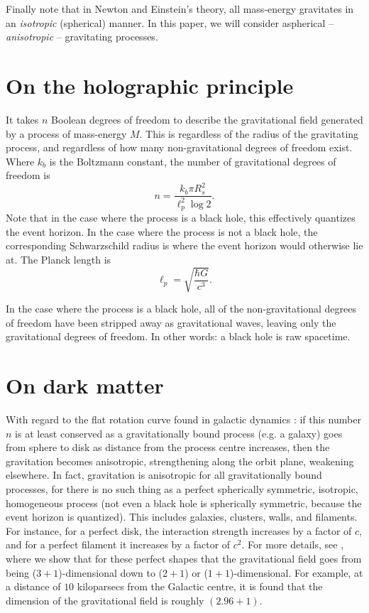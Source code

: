 \documentclass[12pt]{article}
\begin{document}
Finally note that in Newton and Einstein's theory, all mass-energy gravitates in an {\textit{isotropic}} (spherical) manner.
In this paper, we will consider aspherical -- {\textit{anisotropic}} -- gravitating processes.






\section{On the holographic principle}

It takes $n$ Boolean degrees of freedom to describe the gravitational field \cite{hooft, susskind} generated by a process of mass-energy $M$.
This is regardless of the radius of the gravitating process, and regardless of how many non-gravitational degrees of freedom exist.
Where $k_b$ is the Boltzmann constant, the number of gravitational degrees of freedom is
\begin{equation}
n = \frac{k_b \pi R_s^2}{ \ell_p^2 \log 2}.
\end{equation}
Note that in the case where the process is a black hole, this effectively quantizes the event horizon.
In the case where the process is not a black hole, the corresponding Schwarzschild radius is where the event horizon would otherwise lie at.
The Planck length is
\begin{equation}
\ell_p = \sqrt{\frac{\hbar G}{c^3}}.
\end{equation}

In the case where the process is a black hole, all of the non-gravitational degrees of freedom have been stripped away as gravitational waves, leaving only the gravitational degrees of freedom.
In other words: a black hole is raw spacetime.






\section{On dark matter}

With regard to the flat rotation curve found in galactic dynamics \cite{binney}: if this number $n$ is at least conserved as a gravitationally bound process (e.g. a galaxy) goes from sphere to disk as distance from the process centre increases, then the gravitation becomes anisotropic, strengthening along the orbit plane, weakening elsewhere.
In fact, gravitation is anisotropic for all gravitationally bound processes, for there is no such thing as a perfect spherically symmetric, isotropic, homogeneous process (not even a black hole is spherically symmetric, because the event horizon is quantized).
This includes galaxies, clusters, walls, and filaments.
For instance, for a perfect disk, the interaction strength increases by a factor of $c$, and for a perfect filament it increases by a factor of $c^2$.
For more details, see \cite{halayka}, where we show that for these perfect shapes that the gravitational field goes from being ($3+1$)-dimensional down to ($2+1$) or ($1+1$)-dimensional.
For example, at a distance of $10$ kiloparsecs from the Galactic centre, it is found that the dimension of the gravitational field is roughly $(2.96 + 1)$.
\end{document}
